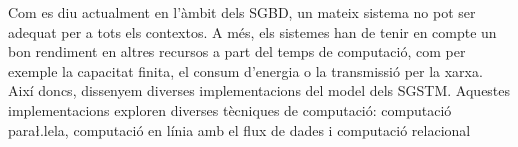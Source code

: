 \documentclass{article}
\begin{document}
Com es diu actualment en l'àmbit dels SGBD, un mateix sistema no
pot ser adequat per a tots els contextos. A més, els sistemes han de
tenir en compte un bon rendiment en altres recursos a part del temps
de computació, com per exemple la capacitat finita, el consum
d'energia o la transmissió per la xarxa. Així doncs, dissenyem
diverses implementacions del model dels SGSTM. Aquestes
implementacions exploren diverses tècniques de computació: computació
para\l.lela, computació en línia amb el flux de dades i computació relacional
\end{document}
